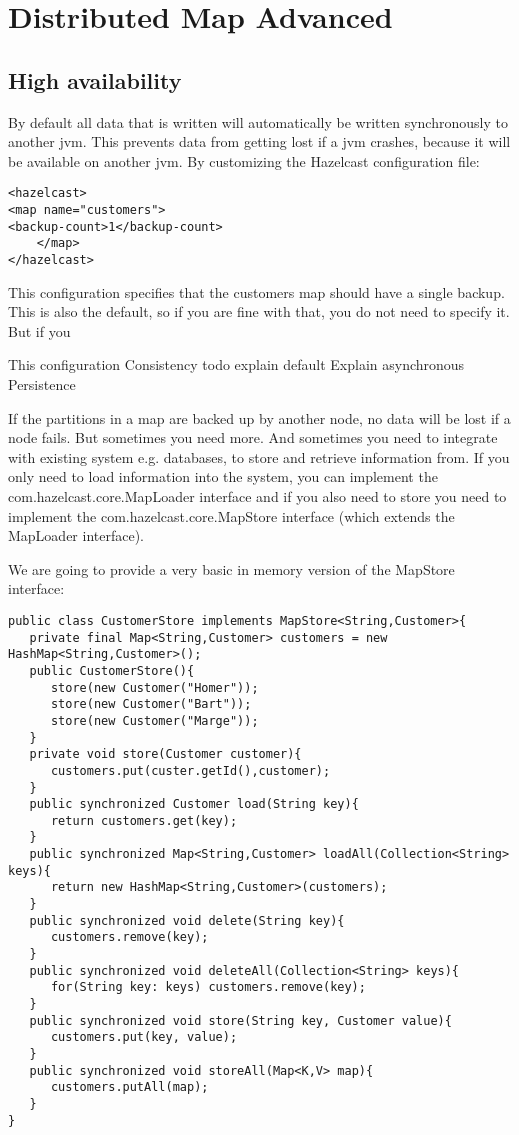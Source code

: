 \chapter{Distributed Map Advanced}

\section{High availability}

By default all data that is written will automatically be written synchronously to another jvm. This prevents data from getting lost if a jvm crashes, because it will be available on another jvm. By customizing the Hazelcast configuration file:
\begin{verbatim}
<hazelcast> 
<map name="customers"> 
<backup-count>1</backup-count>
 	</map> 
</hazelcast>
\end{verbatim}

This configuration specifies that the customers map should have a single backup. This is also the default, so if you are fine with that, you do not need to specify it. But if you 

This configuration 
Consistency
todo explain default
Explain asynchronous
Persistence

If the partitions in a map are backed up by another node, no data will be lost if a node fails. But sometimes you need more. And sometimes you need to integrate with existing system e.g. databases, to store and retrieve information from. If you only need to load information into the system, you can implement the com.hazelcast.core.MapLoader interface and if you also need to store you need to implement the com.hazelcast.core.MapStore interface (which extends the MapLoader interface).

We are going to provide a very basic in memory version of the MapStore interface:

\begin{verbatim}
public class CustomerStore implements MapStore<String,Customer>{
   private final Map<String,Customer> customers = new HashMap<String,Customer>();
   public CustomerStore(){
      store(new Customer("Homer"));
      store(new Customer("Bart"));
      store(new Customer("Marge"));
   }
   private void store(Customer customer){
      customers.put(custer.getId(),customer);
   }
   public synchronized Customer load(String key){
      return customers.get(key);
   }
   public synchronized Map<String,Customer>	loadAll(Collection<String> keys){
      return new HashMap<String,Customer>(customers);
   }
   public synchronized void delete(String key){
      customers.remove(key);
   } 
   public synchronized void deleteAll(Collection<String> keys){
      for(String key: keys) customers.remove(key);
   } 
   public synchronized void store(String key, Customer value){
      customers.put(key, value);
   } 
   public synchronized void storeAll(Map<K,V> map){
      customers.putAll(map);
   }   
}
\end{verbatim}

